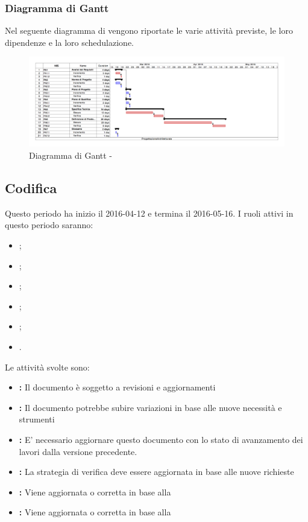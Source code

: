 \documentclass[12pt,a4paper]{article}
\begin{document}
\newpage
\subsubsection{Diagramma di Gantt}
Nel seguente diagramma di  vengono riportate le varie attività previste, le loro dipendenze e la loro schedulazione.

\begin{center}
	\begin{figure}[H]
		\centering
		\includegraphics[width=\textwidth]{../img/ganttProgettazioneArchitetturale.png}
		\caption{Diagramma di Gantt - \FPA{}}
	\end{figure}
\end{center}

\newpage
\subsection{Codifica}
Questo periodo ha inizio il 2016-04-12 e termina il 2016-05-16. I ruoli attivi in questo periodo saranno:
\begin{itemize}
	\item \PM{};
	\item \AM{};
	\item \AN{};
	\item \PR{};
	\item \PG{};
	\item \VR{}.
\end{itemize}

Le attività svolte sono:
\begin{itemize}
	\item \textbf{\AdR{}:} 
	Il documento è soggetto a revisioni e aggiornamenti
	\item \textbf{\NdP{}:}
	Il documento potrebbe subire variazioni in base alle nuove necessità e strumenti
	\item \textbf{\PdP{}:}
	E' necessario aggiornare questo documento con lo stato di avanzamento dei lavori dalla versione precedente.
	\item \textbf{\PdQ{}:}
	La strategia di verifica deve essere aggiornata in base alle nuove richieste
	\item \textbf{\ST{}:}
	Viene aggiornata o corretta in base alla \RP{}
	\item \textbf{\DP{}:} 
	Viene aggiornata o corretta in base alla \RP{}
\end{itemize}
\end{document}
